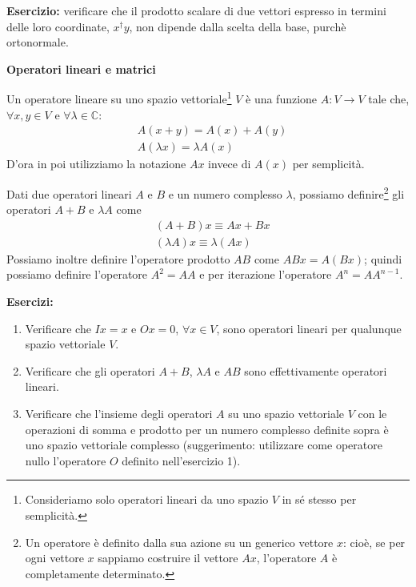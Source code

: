 \documentclass[a4paper,10pt]{article}
\newcommand{\linea}{\vskip14pt \noindent}
\begin{document}
\linea
{\bf Esercizio:} verificare che il prodotto scalare di due vettori espresso in termini delle loro coordinate,
$x^\dag y$, non dipende dalla scelta della base, purch\`e ortonormale.


\newpage

\centerline {\bf Operatori lineari e matrici}

\linea
Un operatore lineare su uno spazio vettoriale\footnote{Consideriamo solo operatori lineari da uno
spazio $V$ in s\'e stesso per semplicit\`a.}
$V$ \`e una funzione $A : V \rightarrow V$ tale che,
$\forall x,y \in V$ e $\forall \lambda \in \mathbb{C}$:
\begin{eqnarray} \nonumber
&A ( x + y ) = A(x)+ A(y) \\
&A(\lambda x) = \lambda A(x) \nonumber
\end{eqnarray}
D'ora in poi utilizziamo la notazione $A x$ invece di $A(x)$ per semplicit\`a.

\linea
Dati due operatori lineari $A$ e $B$ e un numero complesso $\lambda$, possiamo 
definire\footnote{Un operatore \`e definito dalla sua azione su un generico vettore $x$: cio\`e, se per
ogni vettore $x$ sappiamo costruire il vettore $Ax$, l'operatore $A$ \`e completamente determinato.}
gli operatori $A + B$ e $\lambda A$ come
\begin{eqnarray} \nonumber
&(A + B)x \equiv Ax+Bx \\
&(\lambda A)x \equiv \lambda (Ax) \nonumber
\end{eqnarray} 
Possiamo inoltre definire l'operatore prodotto $A B$ come $A B x = A(Bx)$; quindi possiamo definire
l'operatore $A^2 = AA$ e per iterazione l'operatore $A^n = A A^{n-1}$.

\linea
{\bf Esercizi:}
\begin{enumerate}
\item Verificare che $I x=x$ e $Ox=0$, $\forall x\in V$, sono operatori lineari 
per qualunque spazio vettoriale $V$.
\item Verificare che gli operatori $A+B$, $\lambda A$ e $AB$ sono effettivamente operatori lineari.
\item Verificare che l'insieme degli operatori $A$ su uno spazio vettoriale $V$ con le operazioni di somma
e prodotto per un numero complesso definite sopra \`e uno spazio vettoriale complesso 
(suggerimento: utilizzare come operatore nullo l'operatore $O$ definito nell'esercizio 1). 
\end{enumerate}
\end{document}
